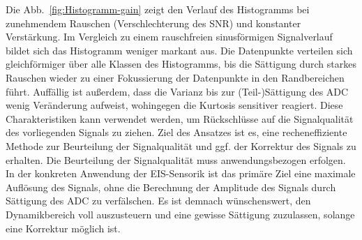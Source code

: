 Die Abb.~\ref{fig:Histogramm-gain} zeigt den Verlauf des Histogramms bei zunehmendem Rauschen (Verschlechterung des SNR) und konstanter Verstärkung. Im Vergleich zu einem rauschfreien sinusförmigen Signalverlauf bildet sich das Histogramm weniger markant aus. Die Datenpunkte verteilen sich gleichförmiger über alle Klassen des Histogramms, bis die Sättigung durch starkes Rauschen wieder zu einer Fokussierung der Datenpunkte in den Randbereichen führt. Auffällig ist außerdem, dass die Varianz bis zur (Teil-)Sättigung des ADC wenig Veränderung aufweist, wohingegen die Kurtosis sensitiver reagiert. Diese Charakteristiken kann verwendet werden, um Rückschlüsse auf die Signalqualität des vorliegenden Signals zu ziehen. Ziel des Ansatzes ist es, eine recheneffiziente Methode zur Beurteilung der Signalqualität und ggf. der Korrektur des Signals zu erhalten. Die Beurteilung der Signalqualität muss anwendungsbezogen erfolgen. In der konkreten Anwendung der EIS-Sensorik ist das primäre Ziel eine maximale Auflösung des Signals, ohne die Berechnung der Amplitude des Signals durch Sättigung des ADC zu verfälschen. Es ist demnach wünschenswert, den Dynamikbereich voll auszusteuern und eine gewisse Sättigung zuzulassen, solange eine Korrektur möglich ist.


%
